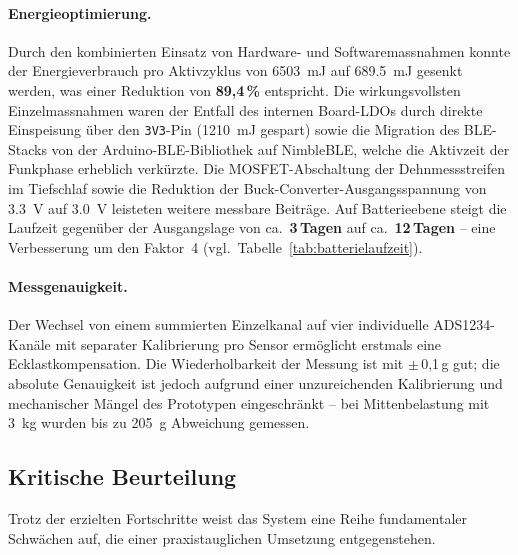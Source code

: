 \documentclass[12pt,a4paper]{article}
\begin{document}
	\paragraph{Energieoptimierung.}
	Durch den kombinierten Einsatz von Hardware- und Softwaremassnahmen konnte der Energieverbrauch pro Aktivzyklus von \SI{6503}{\milli\joule} auf \SI{689.5}{\milli\joule} gesenkt werden, was einer Reduktion von \textbf{89{,}4\,\%} entspricht.
	Die wirkungsvollsten Einzelmassnahmen waren der Entfall des internen Board-LDOs durch direkte Einspeisung über den \texttt{3V3}-Pin (\SI{1210}{\milli\joule} gespart) sowie die Migration des BLE-Stacks von der Arduino-BLE-Bibliothek auf NimbleBLE, welche die Aktivzeit der Funkphase erheblich verkürzte.
	Die MOSFET-Abschaltung der Dehnmessstreifen im Tiefschlaf sowie die Reduktion der Buck-Converter-Ausgangsspannung von \SI{3.3}{\volt} auf \SI{3.0}{\volt} leisteten weitere messbare Beiträge.
	Auf Batterieebene steigt die Laufzeit gegenüber der Ausgangslage von ca.\ \textbf{3\,Tagen} auf ca.\ \textbf{12\,Tagen} -- eine Verbesserung um den Faktor~4 (vgl.\ Tabelle~\ref{tab:batterielaufzeit}).

	\paragraph{Messgenauigkeit.}
	Der Wechsel von einem summierten Einzelkanal auf vier individuelle ADS1234-Kanäle mit separater Kalibrierung pro Sensor ermöglicht erstmals eine Ecklastkompensation.
	Die Wiederholbarkeit der Messung ist mit $\pm$\,0{,}1\,g gut; die absolute Genauigkeit ist jedoch aufgrund einer unzureichenden Kalibrierung und mechanischer Mängel des Prototypen eingeschränkt -- bei Mittenbelastung mit \SI{3}{\kilogram} wurden bis zu \SI{+205}{\gram} Abweichung gemessen.

	\subsection{Kritische Beurteilung}

	Trotz der erzielten Fortschritte weist das System eine Reihe fundamentaler Schwächen auf, die einer praxistauglichen Umsetzung entgegenstehen.
\end{document}
